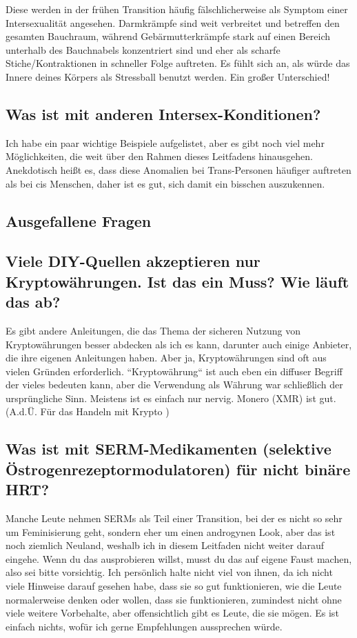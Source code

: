 \documentclass{article}
\begin{document}
{{{Diese werden in der frühen Transition häufig fälschlicherweise als Symptom einer Intersexualität angesehen. Darmkrämpfe sind weit verbreitet und betreffen den gesamten Bauchraum, während Gebärmutterkrämpfe stark auf einen Bereich unterhalb des Bauchnabels konzentriert sind und eher als scharfe Stiche/Kontraktionen in schneller Folge auftreten. Es fühlt sich an, als würde das Innere deines Körpers als Stressball benutzt werden. Ein großer Unterschied!

\subsection{Was ist mit anderen Intersex-Konditionen?}

Ich habe ein paar wichtige Beispiele aufgelistet, aber es gibt noch viel mehr Möglichkeiten, die weit über den Rahmen dieses Leitfadens hinausgehen. Anekdotisch heißt es, dass diese Anomalien bei Trans-Personen häufiger auftreten als bei cis Menschen, daher ist es gut, sich damit ein bisschen auszukennen.


\subsection*{Ausgefallene Fragen}

\subsection{Viele DIY-Quellen akzeptieren nur Kryptowährungen. Ist das ein Muss? Wie läuft das ab?}

Es gibt andere Anleitungen, die das Thema der sicheren Nutzung von Kryptowährungen besser abdecken als ich es kann, darunter auch einige Anbieter, die ihre eigenen Anleitungen haben. Aber ja, Kryptowährungen sind oft aus vielen Gründen erforderlich. “Kryptowährung“ ist auch eben ein diffuser Begriff der vieles bedeuten kann, aber die Verwendung als Währung war schließlich der ursprüngliche Sinn. Meistens ist es einfach nur nervig. Monero (XMR) ist gut. (A.d.Ü. Für das Handeln mit Krypto )

\subsection{Was ist mit SERM-Medikamenten (selektive Östrogenrezeptormodulatoren) für nicht binäre HRT?}

Manche Leute nehmen SERMs als Teil einer Transition, bei der es nicht so sehr um Feminisierung geht, sondern eher um einen androgynen Look, aber das ist noch ziemlich Neuland, weshalb ich in diesem Leitfaden nicht weiter darauf eingehe. Wenn du das ausprobieren willst, musst du das auf eigene Faust machen, also sei bitte vorsichtig. Ich persönlich halte nicht viel von ihnen, da ich nicht viele Hinweise darauf gesehen habe, dass sie so gut funktionieren, wie die Leute normalerweise denken oder wollen, dass sie funktionieren, zumindest nicht ohne viele weitere Vorbehalte, aber offensichtlich gibt es Leute, die sie mögen. Es ist einfach nichts, wofür ich gerne Empfehlungen aussprechen würde.

}}}
\end{document}
